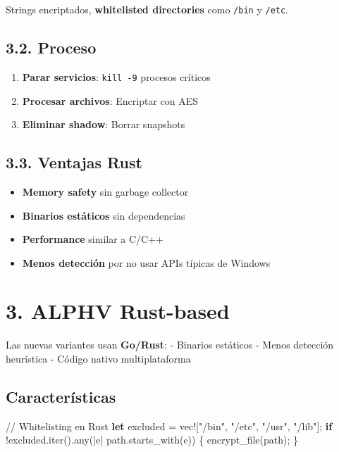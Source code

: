 \documentclass[
  letterpaper,
]{report}
\newenvironment{Shaded}{\begin{snugshade}}{\end{snugshade}}
\newcommand{\CommentTok}[1]{\textcolor[rgb]{0.37,0.37,0.37}{#1}}
\newcommand{\ControlFlowTok}[1]{\textcolor[rgb]{0.00,0.23,0.31}{\textbf{#1}}}
\newcommand{\KeywordTok}[1]{\textcolor[rgb]{0.00,0.23,0.31}{\textbf{#1}}}
\newcommand{\NormalTok}[1]{\textcolor[rgb]{0.00,0.23,0.31}{#1}}
\newcommand{\OperatorTok}[1]{\textcolor[rgb]{0.37,0.37,0.37}{#1}}
\newcommand{\PreprocessorTok}[1]{\textcolor[rgb]{0.68,0.00,0.00}{#1}}
\newcommand{\StringTok}[1]{\textcolor[rgb]{0.13,0.47,0.30}{#1}}
\providecommand{\tightlist}{%
  \setlength{\itemsep}{0pt}\setlength{\parskip}{0pt}}
\begin{document}
Strings encriptados, \textbf{whitelisted directories} como \texttt{/bin}
y \texttt{/etc}.

\subsection{3.2. Proceso}\label{proceso}

\begin{enumerate}
\def\labelenumi{\arabic{enumi}.}
\tightlist
\item
  \textbf{Parar servicios}: \texttt{kill\ -9} procesos críticos
\item
  \textbf{Procesar archivos}: Encriptar con AES
\item
  \textbf{Eliminar shadow}: Borrar snapshots
\end{enumerate}

\subsection{3.3. Ventajas Rust}\label{ventajas-rust}

\begin{itemize}
\tightlist
\item
  \textbf{Memory safety} sin garbage collector
\item
  \textbf{Binarios estáticos} sin dependencias
\item
  \textbf{Performance} similar a C/C++
\item
  \textbf{Menos detección} por no usar APIs típicas de Windows
\end{itemize}

\section{3. ALPHV Rust-based}\label{alphv-rust-based-1}

Las nuevas variantes usan \textbf{Go/Rust}: - Binarios estáticos - Menos
detección heurística - Código nativo multiplataforma

\subsection{Características}\label{caracteruxedsticas}

\begin{Shaded}
\begin{Highlighting}[]
\CommentTok{// Whitelisting en Rust}
\KeywordTok{let}\NormalTok{ excluded }\OperatorTok{=} \PreprocessorTok{vec!}\NormalTok{[}\StringTok{"/bin"}\OperatorTok{,} \StringTok{"/etc"}\OperatorTok{,} \StringTok{"/usr"}\OperatorTok{,} \StringTok{"/lib"}\NormalTok{]}\OperatorTok{;}
\ControlFlowTok{if} \OperatorTok{!}\NormalTok{excluded}\OperatorTok{.}\NormalTok{iter()}\OperatorTok{.}\NormalTok{any(}\OperatorTok{|}\NormalTok{e}\OperatorTok{|}\NormalTok{ path}\OperatorTok{.}\NormalTok{starts\_with(e)) }\OperatorTok{\{}
\NormalTok{    encrypt\_file(path)}\OperatorTok{;}
\OperatorTok{\}}
\end{Highlighting}
\end{Shaded}
\end{document}
